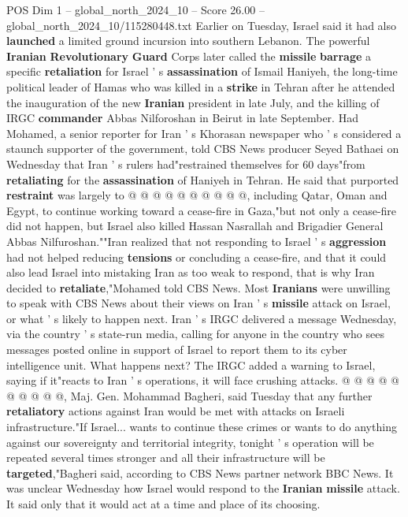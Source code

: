 \begin{textsample}{POS Dim 1 – global\_north\_2024\_10 – Score 26.00 – global\_north\_2024\_10/115280448.txt}
Earlier on Tuesday, Israel said it had also \textbf{launched} a limited ground incursion into southern Lebanon.
The powerful \textbf{Iranian} \textbf{Revolutionary} \textbf{Guard} Corps later called the \textbf{missile} \textbf{barrage} a specific \textbf{retaliation} for Israel ' s \textbf{assassination} of Ismail Haniyeh, the long-time political leader of Hamas who was killed in a \textbf{strike} in Tehran after he attended the inauguration of the new \textbf{Iranian} president in late July, and the killing of IRGC \textbf{commander} Abbas Nilforoshan in Beirut in late September.
Had Mohamed, a senior reporter for Iran ' s Khorasan newspaper who ' s considered a staunch supporter of the government, told CBS News producer Seyed Bathaei on Wednesday that Iran ' s rulers had"restrained themselves for 60 days"from \textbf{retaliating} for the \textbf{assassination} of Haniyeh in Tehran.
He said that purported \textbf{restraint} was largely to @ @ @ @ @ @ @ @ @ @, including Qatar, Oman and Egypt, to continue working toward a cease-fire in Gaza,"but not only a cease-fire did not happen, but Israel also killed Hassan Nasrallah and Brigadier General Abbas Nilfuroshan.""Iran realized that not responding to Israel ' s \textbf{aggression} had not helped reducing \textbf{tensions} or concluding a cease-fire, and that it could also lead Israel into mistaking Iran as too weak to respond, that is why Iran decided to \textbf{retaliate},"Mohamed told CBS News.
Most \textbf{Iranians} were unwilling to speak with CBS News about their views on Iran ' s \textbf{missile} attack on Israel, or what ' s likely to happen next.
Iran ' s IRGC delivered a message Wednesday, via the country ' s state-run media, calling for anyone in the country who sees messages posted online in support of Israel to report them to its cyber intelligence unit.
What happens next?
The IRGC added a warning to Israel, saying if it"reacts to Iran ' s operations, it will face crushing attacks. @ @ @ @ @ @ @ @ @ @, Maj.
Gen.
Mohammad Bagheri, said Tuesday that any further \textbf{retaliatory} actions against Iran would be met with attacks on Israeli infrastructure."If Israel... wants to continue these crimes or wants to do anything against our sovereignty and territorial integrity, tonight ' s operation will be repeated several times stronger and all their infrastructure will be \textbf{targeted},"Bagheri said, according to CBS News partner network BBC News.
It was unclear Wednesday how Israel would respond to the \textbf{Iranian} \textbf{missile} attack.
It said only that it would act at a time and place of its choosing.

\end{textsample}

